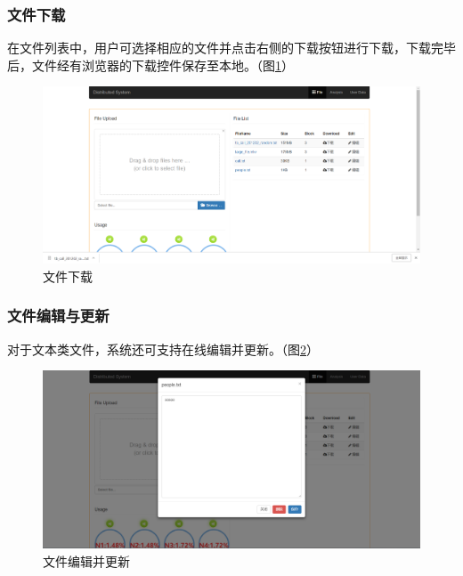 \documentclass[12pt,a4paper]{article}
\begin{document}
\subsubsection{文件下载}
在文件列表中，用户可选择相应的文件并点击右侧的下载按钮进行下载，下载完毕后，文件经有浏览器的下载控件保存至本地。（图\ref{download_1}）
\begin{figure}[htb]
\centering
\includegraphics[width=14cm]{download_1}
\caption{文件下载 \label{download_1}}
\end{figure}

\subsubsection{文件编辑与更新}
对于文本类文件，系统还可支持在线编辑并更新。（图\ref{update_1}）
\begin{figure}[htb]
\centering
\includegraphics[width=14cm]{update_1}
\caption{文件编辑并更新 \label{update_1}}
\end{figure}
\end{document}
